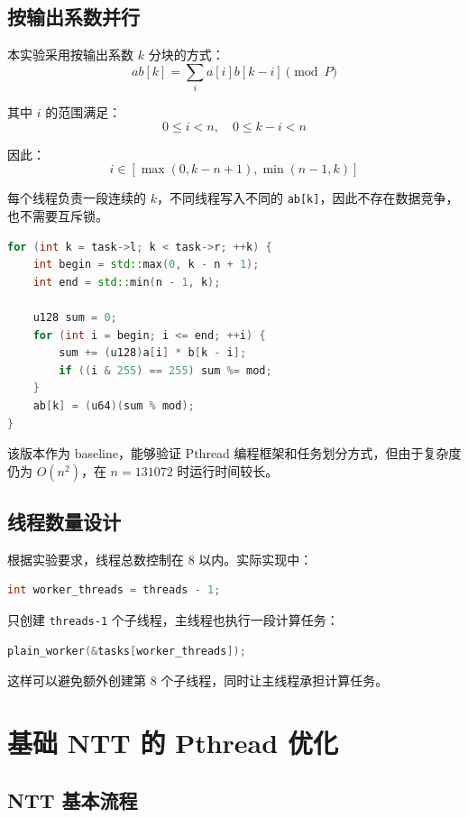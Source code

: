 \documentclass[UTF8,a4paper,12pt]{ctexart}
\begin{document}
\subsection{按输出系数并行}

本实验采用按输出系数 $k$ 分块的方式：
\[
ab[k]=\sum_i a[i]b[k-i]\pmod P
\]

其中 $i$ 的范围满足：
\[
0\le i<n,\quad 0\le k-i<n
\]

因此：
\[
i\in [\max(0,k-n+1),\min(n-1,k)]
\]

每个线程负责一段连续的 $k$，不同线程写入不同的 \texttt{ab[k]}，因此不存在数据竞争，也不需要互斥锁。

\begin{lstlisting}[language=C++]
for (int k = task->l; k < task->r; ++k) {
    int begin = std::max(0, k - n + 1);
    int end = std::min(n - 1, k);

    u128 sum = 0;
    for (int i = begin; i <= end; ++i) {
        sum += (u128)a[i] * b[k - i];
        if ((i & 255) == 255) sum %= mod;
    }
    ab[k] = (u64)(sum % mod);
}
\end{lstlisting}

该版本作为 baseline，能够验证 Pthread 编程框架和任务划分方式，但由于复杂度仍为 $O(n^2)$，在 $n=131072$ 时运行时间较长。

\subsection{线程数量设计}

根据实验要求，线程总数控制在 8 以内。实际实现中：

\begin{lstlisting}[language=C++]
int worker_threads = threads - 1;
\end{lstlisting}

只创建 \texttt{threads-1} 个子线程，主线程也执行一段计算任务：

\begin{lstlisting}[language=C++]
plain_worker(&tasks[worker_threads]);
\end{lstlisting}

这样可以避免额外创建第 8 个子线程，同时让主线程承担计算任务。

\section{基础 NTT 的 Pthread 优化}

\subsection{NTT 基本流程}
\end{document}
